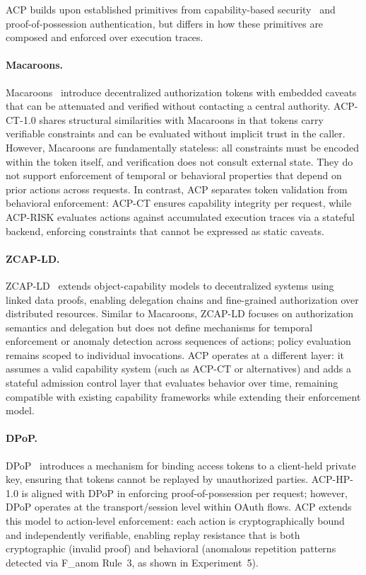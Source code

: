 \documentclass[11pt]{article}
\theoremstyle{definition}
\begin{document}
ACP builds upon established primitives from capability-based security~\cite{capability-security} and
proof-of-possession authentication, but differs in how these primitives are
composed and enforced over execution traces.

\paragraph{Macaroons.}
Macaroons~\cite{birgisson2014macaroons} introduce decentralized authorization tokens
with embedded caveats that can be attenuated and verified without contacting a central
authority.
ACP-CT-1.0 shares structural similarities with Macaroons in that tokens carry verifiable
constraints and can be evaluated without implicit trust in the caller.
However, Macaroons are fundamentally stateless: all constraints must be encoded within the
token itself, and verification does not consult external state.
They do not support enforcement of temporal or behavioral properties that depend on prior
actions across requests.
In contrast, ACP separates token validation from behavioral enforcement: ACP-CT ensures
capability integrity per request, while ACP-RISK evaluates actions against accumulated
execution traces via a stateful backend, enforcing constraints that cannot be expressed as
static caveats.

\paragraph{ZCAP-LD.}
ZCAP-LD~\cite{zcapld} extends object-capability models to decentralized systems using
linked data proofs, enabling delegation chains and fine-grained authorization over
distributed resources.
Similar to Macaroons, ZCAP-LD focuses on authorization semantics and delegation but does
not define mechanisms for temporal enforcement or anomaly detection across sequences of
actions; policy evaluation remains scoped to individual invocations.
ACP operates at a different layer: it assumes a valid capability system (such as ACP-CT or
alternatives) and adds a stateful admission control layer that evaluates behavior over
time, remaining compatible with existing capability frameworks while extending their
enforcement model.

\paragraph{DPoP.}
DPoP~\cite{rfc9449} introduces a mechanism for binding access tokens to a client-held
private key, ensuring that tokens cannot be replayed by unauthorized parties.
ACP-HP-1.0 is aligned with DPoP in enforcing proof-of-possession per request; however,
DPoP operates at the transport/session level within OAuth flows.
ACP extends this model to action-level enforcement: each action is cryptographically bound
and independently verifiable, enabling replay resistance that is both cryptographic
(invalid proof) and behavioral (anomalous repetition patterns detected via F\_anom
Rule~3, as shown in Experiment~5).
\end{document}
